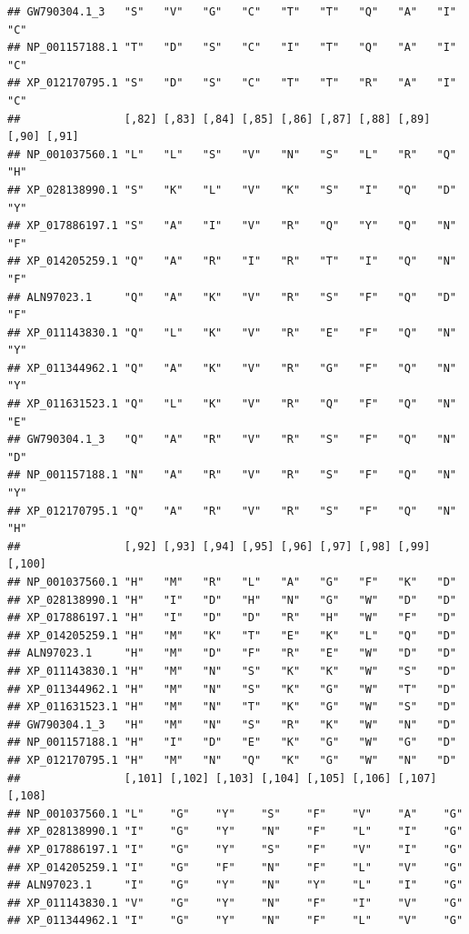 \documentclass[]{article}
\begin{document}
\begin{verbatim}
## GW790304.1_3   "S"   "V"   "G"   "C"   "T"   "T"   "Q"   "A"   "I"   "C"  
## NP_001157188.1 "T"   "D"   "S"   "C"   "I"   "T"   "Q"   "A"   "I"   "C"  
## XP_012170795.1 "S"   "D"   "S"   "C"   "T"   "T"   "R"   "A"   "I"   "C"  
##                [,82] [,83] [,84] [,85] [,86] [,87] [,88] [,89] [,90] [,91]
## NP_001037560.1 "L"   "L"   "S"   "V"   "N"   "S"   "L"   "R"   "Q"   "H"  
## XP_028138990.1 "S"   "K"   "L"   "V"   "K"   "S"   "I"   "Q"   "D"   "Y"  
## XP_017886197.1 "S"   "A"   "I"   "V"   "R"   "Q"   "Y"   "Q"   "N"   "F"  
## XP_014205259.1 "Q"   "A"   "R"   "I"   "R"   "T"   "I"   "Q"   "N"   "F"  
## ALN97023.1     "Q"   "A"   "K"   "V"   "R"   "S"   "F"   "Q"   "D"   "F"  
## XP_011143830.1 "Q"   "L"   "K"   "V"   "R"   "E"   "F"   "Q"   "N"   "Y"  
## XP_011344962.1 "Q"   "A"   "K"   "V"   "R"   "G"   "F"   "Q"   "N"   "Y"  
## XP_011631523.1 "Q"   "L"   "K"   "V"   "R"   "Q"   "F"   "Q"   "N"   "E"  
## GW790304.1_3   "Q"   "A"   "R"   "V"   "R"   "S"   "F"   "Q"   "N"   "D"  
## NP_001157188.1 "N"   "A"   "R"   "V"   "R"   "S"   "F"   "Q"   "N"   "Y"  
## XP_012170795.1 "Q"   "A"   "R"   "V"   "R"   "S"   "F"   "Q"   "N"   "H"  
##                [,92] [,93] [,94] [,95] [,96] [,97] [,98] [,99] [,100]
## NP_001037560.1 "H"   "M"   "R"   "L"   "A"   "G"   "F"   "K"   "D"   
## XP_028138990.1 "H"   "I"   "D"   "H"   "N"   "G"   "W"   "D"   "D"   
## XP_017886197.1 "H"   "I"   "D"   "D"   "R"   "H"   "W"   "F"   "D"   
## XP_014205259.1 "H"   "M"   "K"   "T"   "E"   "K"   "L"   "Q"   "D"   
## ALN97023.1     "H"   "M"   "D"   "F"   "R"   "E"   "W"   "D"   "D"   
## XP_011143830.1 "H"   "M"   "N"   "S"   "K"   "K"   "W"   "S"   "D"   
## XP_011344962.1 "H"   "M"   "N"   "S"   "K"   "G"   "W"   "T"   "D"   
## XP_011631523.1 "H"   "M"   "N"   "T"   "K"   "G"   "W"   "S"   "D"   
## GW790304.1_3   "H"   "M"   "N"   "S"   "R"   "K"   "W"   "N"   "D"   
## NP_001157188.1 "H"   "I"   "D"   "E"   "K"   "G"   "W"   "G"   "D"   
## XP_012170795.1 "H"   "M"   "N"   "Q"   "K"   "G"   "W"   "N"   "D"   
##                [,101] [,102] [,103] [,104] [,105] [,106] [,107] [,108]
## NP_001037560.1 "L"    "G"    "Y"    "S"    "F"    "V"    "A"    "G"   
## XP_028138990.1 "I"    "G"    "Y"    "N"    "F"    "L"    "I"    "G"   
## XP_017886197.1 "I"    "G"    "Y"    "S"    "F"    "V"    "I"    "G"   
## XP_014205259.1 "I"    "G"    "F"    "N"    "F"    "L"    "V"    "G"   
## ALN97023.1     "I"    "G"    "Y"    "N"    "Y"    "L"    "I"    "G"   
## XP_011143830.1 "V"    "G"    "Y"    "N"    "F"    "I"    "V"    "G"   
## XP_011344962.1 "I"    "G"    "Y"    "N"    "F"    "L"    "V"    "G"   

\end{verbatim}
\end{document}
